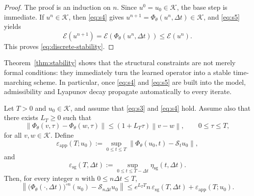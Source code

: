 \documentclass[hidelinks,review,nohypdvips,onefignum,onetabnum]{siamart220329}
\newcommand{\cS}{\mathcal{S}}
\newcommand{\cK}{\mathcal{K}}
\newcommand{\cE}{\mathcal{E}}
\newcommand{\PhiT}{\Phi_{\theta}}
\newcommand{\norm}[1]{\left\lVert #1 \right\rVert}
\begin{document}
\begin{proof}
The proof is an induction on \(n\). Since \(u^0=u_0\in \cK\), the base step is immediate. If \(u^n\in \cK\), then \eqref{eq:s4} gives \(u^{n+1}=\PhiT(u^n,\Delta t)\in \cK\), and \eqref{eq:s5} yields
\begin{equation*}
\cE(u^{n+1})=\cE(\PhiT(u^n,\Delta t))\le \cE(u^n).
\end{equation*}
This proves \eqref{eq:discrete-stability}.
\end{proof}

Theorem~\ref{thm:stability} shows that the structural constraints are not merely formal conditions: they immediately turn the learned operator into a stable time-marching scheme. In particular, once \eqref{eq:s4} and \eqref{eq:s5} are built into the model, admissibility and Lyapunov decay propagate automatically to every iterate.

\begin{proposition}\label{prop:error-decomposition}
Let \(T>0\) and \(u_0\in \cK\), and assume that \eqref{eq:s3} and \eqref{eq:s4} hold. Assume also that there exists \(L_T\ge 0\) such that
\begin{equation}\label{eq:lipschitz-step}
\norm{\PhiT(v,\tau)-\PhiT(w,\tau)} \le (1+L_T\tau)\norm{v-w}, \qquad 0\le \tau\le T,
\end{equation}
for all \(v,w\in \cK\). Define
\begin{equation}\label{eq:app-defect}
\varepsilon_{\mathrm{app}}(T;u_0):=\sup_{0\le t\le T}\norm{\PhiT(u_0,t)-\cS_tu_0},
\end{equation}
and
\begin{equation}\label{eq:sg-defect-dt}
\varepsilon_{\mathrm{sg}}(T,\Delta t):=\sup_{0\le t\le T-\Delta t}\eta_{\mathrm{sg}}(t,\Delta t).
\end{equation}
Then, for every integer \(n\) with \(0\le n\Delta t\le T\),
\begin{equation}\label{eq:error-bound}
\norm{\bigl(\PhiT(\cdot,\Delta t)\bigr)^{\circ n}(u_0)-\cS_{n\Delta t}u_0}
\le e^{L_TT}n\,\varepsilon_{\mathrm{sg}}(T,\Delta t)+\varepsilon_{\mathrm{app}}(T;u_0).
\end{equation}
\end{proposition}
\end{document}
